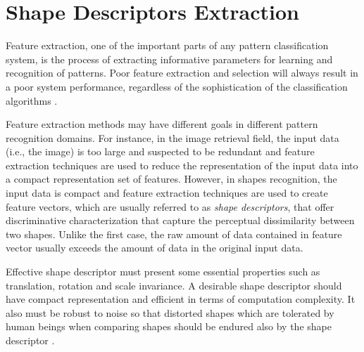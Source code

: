 
\newpage{}

\section{Shape Descriptors Extraction}
\label{sec:feature_extraction}
\iftoggle{edit-mode}{\hspace{0pt}\marginpar{Feature extraction}}{}
Feature extraction, one of the important parts of any pattern classification system, is the process of extracting informative parameters for learning and recognition of patterns. 
Poor feature extraction and selection will always result in a poor system performance, regardless of the sophistication of the classification algorithms \cite{parizeau2001character}.

\iftoggle{edit-mode}{\hspace{0pt}\marginpar{Introduction - Cont.}}{}
Feature extraction methods may have different goals in different pattern recognition domains. 
For instance, in the image retrieval field, the input data (i.e., the image) is too large and suspected to be redundant and feature extraction techniques are used to reduce the representation of the input data into a compact representation set of features. 
However, in shapes recognition, the input data is compact and feature extraction techniques are used to create feature vectors, which are usually referred to as \emph{shape descriptors}, that offer discriminative characterization that capture the perceptual dissimilarity between two shapes. 
Unlike the first case, the raw amount of data contained in feature vector usually exceeds the amount of data in the original input data.

\iftoggle{edit-mode}{\hspace{0pt}\marginpar{Shape Descriptors}}{}
Effective shape descriptor must present some essential properties such as translation, rotation and scale invariance. 
A desirable shape descriptor should have compact representation and efficient in terms of computation complexity.
It also must be robust to noise so that distorted shapes which are tolerated by human beings when comparing shapes should be endured also by the shape descriptor \cite{zhang2004review, kim2000region}.


